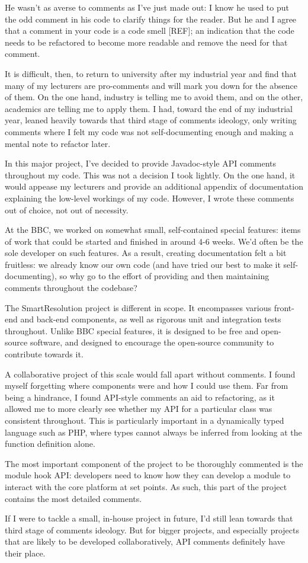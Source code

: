 He wasn't as averse to comments as I've just made out: I know he used to put the odd comment in his code to clarify things for the reader. But he and I agree that a comment in your code is a code smell [REF]; an indication that the code needs to be refactored to become more readable and remove the need for that comment.

It is difficult, then, to return to university after my industrial year and find that many of my lecturers are pro-comments and will mark you down for the absence of them. On the one hand, industry is telling me to avoid them, and on the other, academics are telling me to apply them. I had, toward the end of my industrial year, leaned heavily towards that third stage of comments ideology, only writing comments where I felt my code was not self-documenting enough and making a mental note to refactor later.

In this major project, I've decided to provide Javadoc-style API comments throughout my code. This was not a decision I took lightly. On the one hand, it would appease my lecturers and provide an additional appendix of documentation explaining the low-level workings of my code. However, I wrote these comments out of choice, not out of necessity.

At the BBC, we worked on somewhat small, self-contained special features: items of work that could be started and finished in around 4-6 weeks. We'd often be the sole developer on such features. As a result, creating documentation felt a bit fruitless: we already know our own code (and have tried our best to make it self-documenting), so why go to the effort of providing and then maintaining comments throughout the codebase?

The SmartResolution project is different in scope. It encompasses various front-end and back-end components, as well as rigorous unit and integration tests throughout. Unlike BBC special features, it is designed to be free and open-source software, and designed to encourage the open-source community to contribute towards it.

A collaborative project of this scale would fall apart without comments. I found myself forgetting where components were and how I could use them. Far from being a hindrance, I found API-style comments an aid to refactoring, as it allowed me to more clearly see whether my API for a particular class was consistent throughout. This is particularly important in a dynamically typed language such as PHP, where types cannot always be inferred from looking at the function definition alone.

The most important component of the project to be thoroughly commented is the module hook API: developers need to know how they can develop a module to interact with the core platform at set points. As such, this part of the project contains the most detailed comments.

If I were to tackle a small, in-house project in future, I'd still lean towards that third stage of comments ideology. But for bigger projects, and especially projects that are likely to be developed collaboratively, API comments definitely have their place.
